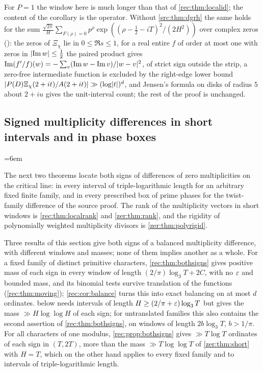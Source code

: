 For $P=1$ the window here is much longer than that of \cref{rec:thm:localid}; the content of the
corollary is the operator. Without \cref{src:thm:dgrh} the same holds for the sum
$\frac{\sqrt{2\pi}}H\sum_{F(\rho)=0}p^\rho\exp((\rho-\tfrac12-iT)^2/(2H^2))$ over complex zeros (\stU): the zeros of
$\Xi_\chi$ lie in $0\le\Re s\le1$, for a real entire $f$ of order at most one with zeros in
$\lvert\operatorname{Im} w\rvert\le\tfrac12$ the paired product gives $\operatorname{Im}(f'/f)(w)=-\sum_v(\operatorname{Im} w-\operatorname{Im} v)/\lvert w-v\rvert^2$, of strict sign
outside the strip, a zero-free intermediate function is excluded by the right-edge lower bound
$\lvert P(D)\Xi_\chi(2+it)/A(2+it)\rvert\gg(\log\lvert t\rvert)^d$, and Jensen's formula on disks of radius $5$ about
$2+iu$ gives the unit-interval count; the rest of the proof is unchanged.

\subsection{Signed multiplicity differences in short intervals and in phase boxes}\label{zer:sec:short}
{\emergencystretch=6em}

The next two theorems locate both signs of differences of zero multiplicities on the
critical line: in every interval of triple-logarithmic length for an arbitrary fixed finite
family, and in every prescribed box of prime phases for the twist-family difference of the
source proof. The rank of the multiplicity vectors in short windows is \cref{rec:thm:localrank} and
\cref{zer:thm:rank}, and the rigidity of polynomially weighted multiplicity divisors is
\cref{zer:thm:polyrigid}.

Three results of this section give both signs of a balanced multiplicity difference, with different
windows and masses; none of them implies another as a whole. For a fixed family of distinct primitive
characters, \cref{rec:thm:bothsigns} gives positive mass of each sign in every window of length
$(2/\pi)\log_3T+2C$, with no $\varepsilon$ and bounded mass, and its binomial tests survive translation of the
functions (\cref{rec:thm:moving}); \cref{rec:cor:balance} turns this into exact balancing on at most $d$
ordinates.  below needs intervals of length $H\ge(2/\pi+\varepsilon)\log_3T$ but gives the
mass $\gg H\log\log H$ of each sign; for untranslated families this also contains the second assertion
of \cref{rec:thm:bothsigns}, on windows of length $2b\log_3T$, $b>1/\pi$. For all characters of one
modulus, \cref{rec:prop:bothsigns} gives $\gg T\log T$ ordinates of each sign in $(T,2T)$, more than the
mass $\gg T\log\log T$ of \cref{zer:thm:short} with $H=T$, which on the other hand applies to every
fixed family and to intervals of triple-logarithmic length.

